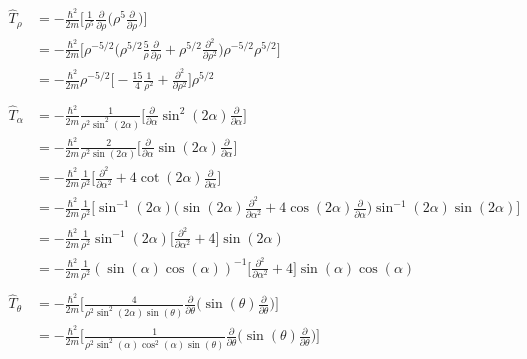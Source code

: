 \documentclass{article}
\begin{document}
\begin{subequations}
\begin{align*}
\hat{T}_{\rho} &= -\frac{\hbar^2}{2m} \Big[ \frac{1}{\rho^5}\frac{\partial}{\partial\rho} \Big( \rho^5 \frac{\partial}{\partial\rho} \Big)  \Big]\\ 
                      &= -\frac{\hbar^2}{2m} \Big[ \rho^{-5/2} \Big( \rho^{5/2} \frac{5}{\rho} \frac{\partial}{\partial\rho} + \rho^{5/2} \frac{\partial^2}{\partial\rho^2} \Big) \rho^{-5/2} \rho^{5/2} \Big]\\
                      &= -\frac{\hbar^2}{2m} \rho^{-5/2} \Big[  -\frac{15}{4} \frac{1}{\rho^2} + \frac{\partial^2}{\partial\rho^2} \Big] \rho^{5/2}\\ \\
\hat{T}_{\alpha} &= -\frac{\hbar^2}{2m}  \frac{1}{\rho^2 \sin^2(2\alpha)}  \Big[ \frac{\partial}{\partial\alpha} \sin^2(2\alpha) \frac{\partial}{\partial\alpha} \Big]\\ 
                      &= -\frac{\hbar^2}{2m} \frac{2}{\rho^2 \sin(2\alpha)}  \Big[ \frac{\partial}{\partial\alpha} \sin(2\alpha) \frac{\partial}{\partial\alpha} \Big]\\\
                      &= -\frac{\hbar^2}{2m} \frac{1}{\rho^2} \Big[ \frac{\partial^2}{\partial\alpha^2} + 4\cot(2\alpha) \frac{\partial}{\partial\alpha} \Big]\\
                      &= -\frac{\hbar^2}{2m} \frac{1}{\rho^2} \Big[ \sin^{-1}(2\alpha) \Big(\sin(2\alpha)\frac{\partial^2}{\partial\alpha^2} + 4\cos(2\alpha) \frac{\partial}{\partial\alpha} \Big) \sin^{-1}(2\alpha) \sin(2\alpha) \Big]\\
                      &= -\frac{\hbar^2}{2m} \frac{1}{\rho^2}\sin^{-1}(2\alpha) \Big[ \frac{\partial^2}{\partial\alpha^2} + 4 \Big] \sin(2\alpha)\\
                      &= -\frac{\hbar^2}{2m} \frac{1}{\rho^2}(\sin(\alpha)\cos(\alpha))^{-1} \Big[ \frac{\partial^2}{\partial\alpha^2} + 4 \Big] \sin(\alpha)\cos(\alpha)\\ \\
\hat{T}_{\theta} &= -\frac{\hbar^2}{2m} \Big[ \frac{4}{\rho^2 \sin^2(2\alpha)\sin(\theta)} \frac{\partial}{\partial\theta} \Big( \sin(\theta) \frac{\partial}{\partial\theta} \Big) \Big]\\ 
                      	&= -\frac{\hbar^2}{2m} \Big[ \frac{1}{\rho^2 \sin^2(\alpha)\cos^2(\alpha)\sin(\theta)} \frac{\partial}{\partial\theta} \Big( \sin(\theta) \frac{\partial}{\partial\theta} \Big) \Big]\\ 
\end{align*}                      		
\end{subequations} 
\end{document}

